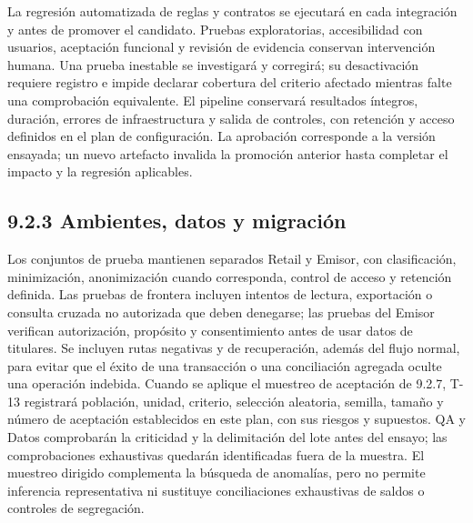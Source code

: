 \documentclass[11pt]{article}
\begin{document}
La regresión automatizada de reglas y contratos se ejecutará en cada integración y antes de promover el candidato. Pruebas exploratorias, accesibilidad con usuarios, aceptación funcional y revisión de evidencia conservan intervención humana. Una prueba inestable se investigará y corregirá; su desactivación requiere registro e impide declarar cobertura del criterio afectado mientras falte una comprobación equivalente. El pipeline conservará resultados íntegros, duración, errores de infraestructura y salida de controles, con retención y acceso definidos en el plan de configuración. La aprobación corresponde a la versión ensayada; un nuevo artefacto invalida la promoción anterior hasta completar el impacto y la regresión aplicables.

\subsection{9.2.3 Ambientes, datos y migración}

Los conjuntos de prueba mantienen separados Retail y Emisor, con clasificación, minimización, anonimización cuando corresponda, control de acceso y retención definida. Las pruebas de frontera incluyen intentos de lectura, exportación o consulta cruzada no autorizada que deben denegarse; las pruebas del Emisor verifican autorización, propósito y consentimiento antes de usar datos de titulares. Se incluyen rutas negativas y de recuperación, además del flujo normal, para evitar que el éxito de una transacción o una conciliación agregada oculte una operación indebida. Cuando se aplique el muestreo de aceptación de 9.2.7, T-13 registrará población, unidad, criterio, selección aleatoria, semilla, tamaño y número de aceptación establecidos en este plan, con sus riesgos y supuestos. QA y Datos comprobarán la criticidad y la delimitación del lote antes del ensayo; las comprobaciones exhaustivas quedarán identificadas fuera de la muestra. El muestreo dirigido complementa la búsqueda de anomalías, pero no permite inferencia representativa ni sustituye conciliaciones exhaustivas de saldos o controles de segregación.
\end{document}
